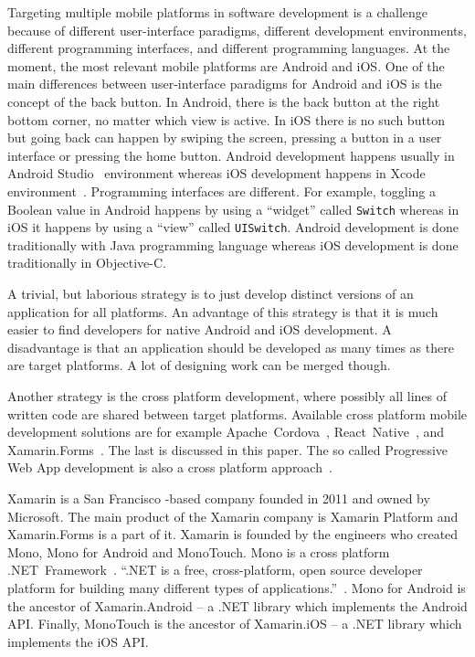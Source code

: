 \documentclass[conference]{IEEEtran}
\begin{document}
Targeting multiple mobile platforms in software development is a challenge because of different user-interface paradigms, different development environments, different programming interfaces, and different programming languages. At the moment, the most relevant mobile platforms are Android and iOS. One of the main differences between user-interface paradigms for Android and iOS is the concept of the back button. In Android, there is the back button at the right bottom corner, no matter which view is active. In iOS there is no such button but going back can happen by swiping the screen, pressing a button in a user interface or pressing the home button. Android development happens usually in Android Studio~\cite{androidstudio} environment whereas iOS development happens in Xcode environment~\cite{xcode}. Programming interfaces are different. For example, toggling a Boolean value in Android happens by using a ``widget'' called \texttt{Switch} whereas in iOS it happens by using a ``view'' called \texttt{UISwitch}. Android development is done traditionally with Java programming language whereas iOS development is done traditionally in Objective-C.

A trivial, but laborious strategy is to just develop distinct versions of an application for all platforms. An advantage of this strategy is that it is much easier to find developers for native Android and iOS development. A disadvantage is that an application should be developed as many times as there are target platforms. A lot of designing work can be merged though.

Another strategy is the cross platform development, where possibly all lines of written code are shared between target platforms. Available cross platform mobile development solutions are for example Apache~Cordova~\cite{cordova}, React~Native~\cite{react}, and Xamarin.Forms~\cite{xamarin.forms}. The last is discussed in this paper. The so called Progressive Web App development is also a cross platform approach~\cite{7972716}.

Xamarin is a San Francisco -based company founded in 2011 and owned by Microsoft. The main product of the Xamarin company is Xamarin Platform and Xamarin.Forms is a part of it. Xamarin is founded by the engineers who created Mono, Mono for Android and MonoTouch. Mono is a cross platform .NET~Framework~\cite{mono}. ``.NET is a free, cross-platform, open source developer platform for building many different types of applications.''~\cite{dotnet}. Mono for Android is the ancestor of Xamarin.Android -- a .NET library which implements the Android API. Finally, MonoTouch is the ancestor of Xamarin.iOS -- a .NET library which implements the iOS API.
\end{document}
